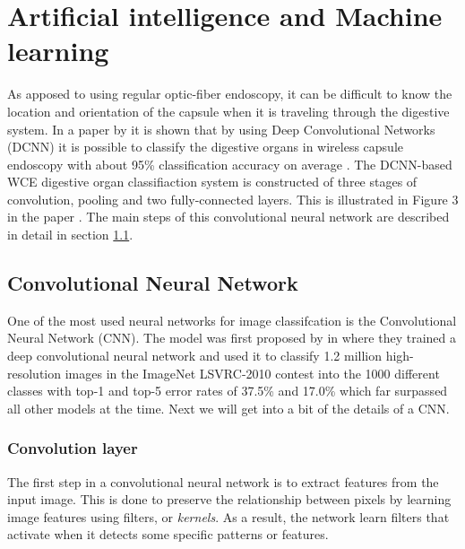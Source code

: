 \documentclass[thesis.tex]{subfiles}
\begin{document}
\section{Artificial intelligence and Machine learning}

As apposed to using regular optic-fiber endoscopy, it can be difficult to know the location and orientation of the capsule when it is traveling through the digestive system. In a paper by \citeauthor*{ClassifyingDigestive15} it is shown that by using Deep Convolutional Networks (DCNN) it is possible to classify the digestive organs in wireless capsule endoscopy with about 95\% classification accuracy on average \cite{ClassifyingDigestive15}.
The DCNN-based WCE digestive organ classifiaction system is constructed of three stages of convolution, pooling and two fully-connected layers. This is illustrated in Figure 3 in the paper \cite{ClassifyingDigestive15}. The main steps of this convolutional neural network are described in detail in section \ref{convolutional_neural_network}.


\subsection{Convolutional Neural Network} \label{convolutional_neural_network}
One of the most used neural networks for image classifcation is the Convolutional Neural Network (CNN). The model was first proposed by \citeauthor*{ImageNetClassification12} in \citeyear{ImageNetClassification12} \cite{ImageNetClassification12} where they trained a deep convolutional neural network and used it to classify 1.2 million high-resolution images in the ImageNet LSVRC-2010 contest into the 1000 different classes with top-1 and top-5 error rates of 37.5\% and 17.0\% which far surpassed all other models at the time. Next we will get into a bit of the details of a CNN.


\subsubsection{Convolution layer}
The first step in a convolutional neural network is to extract features from the input image. This is done to preserve the relationship between pixels by learning image features using filters, or \textit{kernels}. As a result, the network learn filters that activate when it detects some specific patterns or features.
\end{document}
